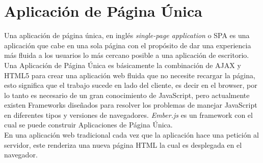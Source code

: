 
\section{Aplicación de Página Única}
\label{sec:Single Page App}

Una aplicación de página única, en inglés  \emph{single-page application} o SPA es una aplicación que cabe en una sola página con el propósito de dar una experiencia más fluida a los usuarios lo más cercano posible a una aplicación de escritorio. \cite{spa_wiki}\\

Una Aplicación de Página Única es básicamente la combinación de AJAX y HTML5 para crear una aplicación web fluida que no necesite recargar la página, esto significa que el trabajo sucede en lado del cliente, es decir en el browser, por lo tanto es necesario de un gran conocimiento de JavaScript, pero actualmente existen Frameworks diseñados para resolver los problemas de manejar JavaScript en diferentes tipos y versiones de navegadores. \emph{Ember.js} es un framework con el cual se puede construir Aplicaciones de Página Única. \\





En una aplicación web tradicional cada vez que la aplicación hace una petición al servidor, este renderiza una nueva página HTML la cual es desplegada en el navegador.\\



